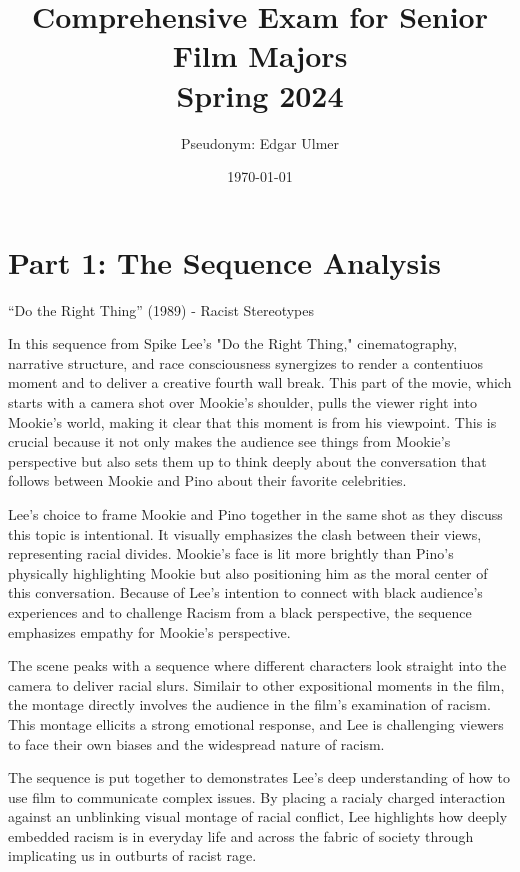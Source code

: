 \documentclass[12pt]{article}
\title{Comprehensive Exam for Senior Film Majors\\Spring 2024}
\author{Pseudonym: Edgar Ulmer}
\date{\today}
\begin{document}
\maketitle

\thispagestyle{empty}

\section*{Part 1: The Sequence Analysis}

“Do the Right Thing” (1989) - Racist Stereotypes

In this sequence from Spike Lee's "Do the Right Thing," cinematography, narrative structure, and race consciousness synergizes to render a contentiuos moment and to deliver a creative fourth wall break. This part of the movie, which starts with a camera shot over Mookie's shoulder, pulls the viewer right into Mookie's world, making it clear that this moment is from his viewpoint. This is crucial because it not only makes the audience see things from Mookie's perspective but also sets them up to think deeply about the conversation that follows between Mookie and Pino about their favorite celebrities.

Lee's choice to frame Mookie and Pino together in the same shot as they discuss this topic is intentional. It visually emphasizes the clash between their views, representing racial divides. Mookie's face is lit more brightly than Pino's  physically highlighting Mookie but also positioning him as the moral center of this conversation. Because of Lee's intention to connect with black audience's experiences and to challenge Racism from a black perspective, the sequence emphasizes empathy for Mookie's perspective.

The scene peaks with a sequence where different characters look straight into the camera to deliver racial slurs. Similair to other expositional moments in the film, the montage directly involves the audience in the film's examination of racism. This montage ellicits a strong emotional response, and Lee is challenging viewers to face their own biases and the widespread nature of racism.

The sequence is put together to demonstrates Lee's deep understanding of how to use film to communicate complex issues. By placing a racialy charged interaction against an unblinking visual montage of racial conflict, Lee highlights how deeply embedded racism is in everyday life and across the fabric of society through implicating us in outburts of racist rage.
\end{document}
